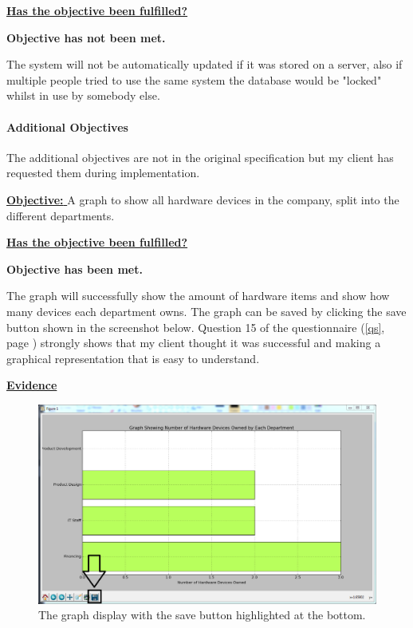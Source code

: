 \underline{\textbf{Has the objective been fulfilled?}}

\textbf{Objective has not been met.}

The system will not be automatically updated if it was stored on a server, also if multiple people tried to use the same system the database would be "locked" whilst in use by somebody else. 


\paragraph{Additional Objectives}

The additional objectives are not in the original specification but my client has requested them during implementation.

\underline{\textbf{Objective:} } A graph to show all hardware devices in the company, split into the different departments.

\underline{\textbf{Has the objective been fulfilled?}}

\textbf{Objective has been met.} 

The graph will successfully show the amount of hardware items and show how many devices each department owns. The graph can be saved by clicking the save button shown in the screenshot below. Question 15 of the questionnaire (\ref{qs}, page \pageref{qs}) strongly shows that my client thought it was successful and making a graphical representation that is easy to understand.

\underline{\textbf{Evidence}}



\begin{figure}[H]
    \includegraphics[width=\textwidth]{./Manual/Images/graph2.png}
    \caption{The graph display with the save button highlighted at the bottom.} 
\end{figure}

